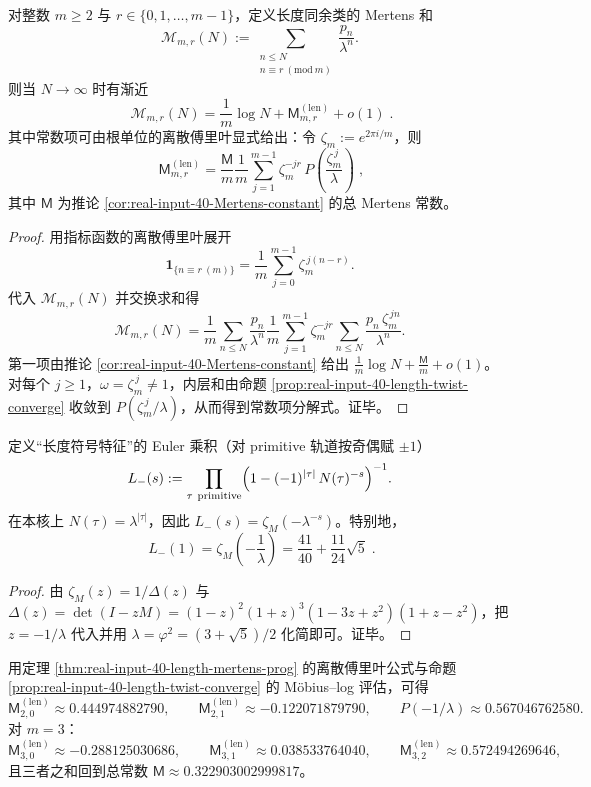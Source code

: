 \begin{theorem}\label{thm:real-input-40-length-mertens-prog}
对整数 \(m\ge 2\) 与 \(r\in\{0,1,\dots,m-1\}\)，定义长度同余类的 Mertens 和
\[
\mathcal{M}_{m,r}(N):=\sum_{\substack{n\le N\\ n\equiv r\ (\mathrm{mod}\ m)}}\frac{p_n}{\lambda^n}.
\]
则当 \(N\to\infty\) 时有渐近
\[
\boxed{\;
\mathcal{M}_{m,r}(N)=\frac{1}{m}\log N+\mathsf{M}^{(\mathrm{len})}_{m,r}+o(1)\; }.
\]
其中常数项可由根单位的离散傅里叶显式给出：令 \(\zeta_m:=e^{2\pi i/m}\)，则
\[
\boxed{\;
\mathsf{M}^{(\mathrm{len})}_{m,r}
=\frac{\mathsf{M}}{m}
\frac{1}{m}\sum_{j=1}^{m-1}\zeta_m^{-jr}\,P\!\left(\frac{\zeta_m^{\,j}}{\lambda}\right)\; },
\]
其中 \(\mathsf{M}\) 为推论 \ref{cor:real-input-40-Mertens-constant} 的总 Mertens 常数。
\end{theorem}
\begin{proof}
用指标函数的离散傅里叶展开
\[
\mathbf{1}_{\{n\equiv r\ (m)\}}
=\frac{1}{m}\sum_{j=0}^{m-1}\zeta_m^{\,j(n-r)}.
\]
代入 \(\mathcal{M}_{m,r}(N)\) 并交换求和得
\[
\mathcal{M}_{m,r}(N)
=\frac{1}{m}\sum_{n\le N}\frac{p_n}{\lambda^n}
\frac{1}{m}\sum_{j=1}^{m-1}\zeta_m^{-jr}\sum_{n\le N}\frac{p_n\,\zeta_m^{\,jn}}{\lambda^n}.
\]
第一项由推论 \ref{cor:real-input-40-Mertens-constant} 给出
\(
\frac{1}{m}\log N+\frac{\mathsf{M}}{m}+o(1)
\)。
对每个 \(j\ge 1\)，\(\omega=\zeta_m^{\,j}\neq 1\)，内层和由命题 \ref{prop:real-input-40-length-twist-converge} 收敛到 \(P(\zeta_m^{\,j}/\lambda)\)，从而得到常数项分解式。证毕。
\end{proof}

\begin{corollary}\label{cor:real-input-40-length-sign-L1}
定义“长度符号特征”的 Euler 乘积（对 primitive 轨道按奇偶赋 \(\pm 1\)）
\[
L_-(s):=\prod_{\tau\ \mathrm{primitive}}\Bigl(1-(-1)^{|\tau|}\,N(\tau)^{-s}\Bigr)^{-1}.
\]
在本核上 \(N(\tau)=\lambda^{|\tau|}\)，因此 \(L_-(s)=\zeta_M(-\lambda^{-s})\)。特别地，
\[
\boxed{\;
L_-(1)=\zeta_M\!\left(-\frac{1}{\lambda}\right)
=\frac{41}{40}+\frac{11}{24}\sqrt5\; }.
\]
\end{corollary}
\begin{proof}
由 \(\zeta_M(z)=1/\Delta(z)\) 与 \(\Delta(z)=\det(I-zM)=(1-z)^2(1+z)^3(1-3z+z^2)(1+z-z^2)\)，把 \(z=-1/\lambda\) 代入并用 \(\lambda=\varphi^2=(3+\sqrt5)/2\) 化简即可。证毕。
\end{proof}

\begin{remark}[可审计数值锚点：\texorpdfstring{$m=2,3$}{m=2,3} 的长度同余常数]\label{rem:real-input-40-length-mertens-numeric}
用定理 \ref{thm:real-input-40-length-mertens-prog} 的离散傅里叶公式与命题 \ref{prop:real-input-40-length-twist-converge} 的 Möbius--log 评估，可得
\[
\mathsf{M}^{(\mathrm{len})}_{2,0}\approx 0.444974882790,\qquad
\mathsf{M}^{(\mathrm{len})}_{2,1}\approx -0.122071879790,
\qquad
P(-1/\lambda)\approx 0.567046762580.
\]
对 \(m=3\)：
\[
\mathsf{M}^{(\mathrm{len})}_{3,0}\approx -0.288125030686,\qquad
\mathsf{M}^{(\mathrm{len})}_{3,1}\approx 0.038533764040,\qquad
\mathsf{M}^{(\mathrm{len})}_{3,2}\approx 0.572494269646,
\]
且三者之和回到总常数 \(\mathsf{M}\approx 0.322903002999817\)。
\end{remark}

